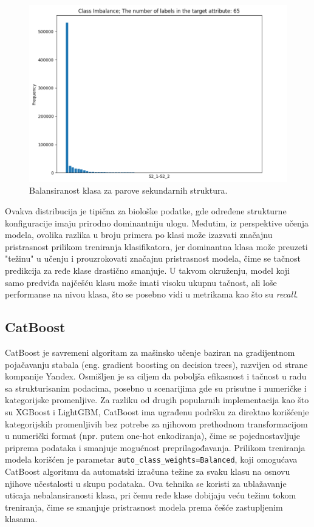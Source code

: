 \documentclass[a4paper,12pt]{article}
\begin{document}
\begin{figure}[htbp]
    \centering
    \includegraphics[width=1\textwidth]{./images/ss_imbalance.png}
    \caption{Balansiranost klasa za parove sekundarnih struktura.}
    \label{Slika:ss_imbalance}
\end{figure}
\newpage
Ovakva distribucija je tipična za biološke podatke, gde određene strukturne konfiguracije imaju prirodno dominantniju ulogu. Međutim, iz perspektive učenja modela, ovolika razlika u broju primera po klasi može izazvati značajnu pristrasnost prilikom treniranja klasifikatora, jer dominantna klasa može preuzeti "težinu" u učenju i prouzrokovati značajnu pristrasnost modela, čime se tačnost predikcija za ređe klase drastično smanjuje. U takvom okruženju, model koji samo predviđa najčešću klasu može imati visoku ukupnu tačnost, ali loše performanse na nivou klasa, što se posebno vidi u metrikama kao što su \textit{recall}.
\newpage

\subsection{CatBoost}

CatBoost je savremeni algoritam za mašinsko učenje baziran na gradijentnom pojačavanju stabala (eng. gradient boosting on decision trees), razvijen od strane kompanije Yandex. Osmišljen je sa ciljem da poboljša efikasnost i tačnost u radu sa strukturisanim podacima, posebno u scenarijima gde su prisutne i numeričke i kategorijske promenljive. Za razliku od drugih popularnih implementacija kao što su XGBoost i LightGBM, CatBoost ima ugrađenu podršku za direktno korišćenje kategorijskih promenljivih bez potrebe za njihovom prethodnom transformacijom u numerički format (npr. putem one-hot enkodiranja), čime se pojednostavljuje priprema podataka i smanjuje mogućnost preprilagođavanja.
Prilikom treniranja modela korišćen je parametar \texttt{auto\_class\_weights=\textquotesingle Balanced\textquotesingle}, koji omogućava CatBoost algoritmu da automatski izračuna težine za svaku klasu na osnovu njihove učestalosti u skupu podataka. Ova tehnika se koristi za ublažavanje uticaja nebalansiranosti klasa, pri čemu ređe klase dobijaju veću težinu tokom treniranja, čime se smanjuje pristrasnost modela prema češće zastupljenim klasama.
\end{document}
